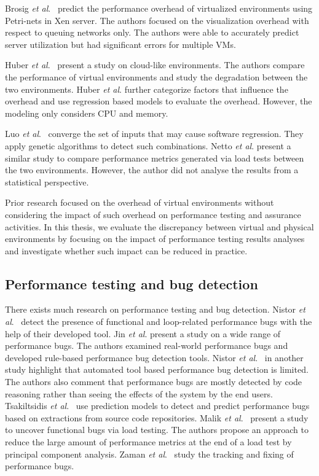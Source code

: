Brosig \textit{et al$.$}~\cite{brosig2013evaluating} predict the performance overhead of virtualized environments using Petri-nets in Xen server. The authors focused on the visualization overhead with respect to queuing networks only. The authors were able to accurately predict server utilization but had significant errors for multiple VMs.


Huber \textit{et al$.$}~\cite{huber2011evaluating} present a study on cloud-like environments. The authors compare the performance of virtual environments and study the degradation between the two environments. Huber \textit{et al$.$} further categorize factors that influence the overhead and use regression based models to evaluate the overhead. However, the modeling only considers CPU and memory.


Luo \textit{et al$.$}~\cite{Luo:2016:MPR:2901739.2901765} converge the set of inputs that may cause software regression. They apply genetic algorithms to detect such combinations. Netto \textit{et al$.$} \cite{netto2011evaluating} present a similar study to compare performance metrics generated via load tests between the two environments. However, the author did not analyse the results from a statistical perspective.

Prior research focused on the overhead of virtual environments without considering the impact of such overhead on performance testing and assurance activities. In this thesis, we evaluate the discrepancy between virtual and physical environments by focusing on the impact of performance testing results analyses and investigate whether such impact can be reduced in practice.


\subsection{Performance testing and bug detection}

There exists much research on performance testing and bug detection. Nistor \textit{et al$.$}~\cite{Nistor} detect the presence of functional and loop-related performance bugs with the help of their developed tool. Jin \textit{et al$.$} \cite{Jin} present a study on a wide range of performance bugs. The authors examined real-world performance bugs and developed rule-based performance bug detection tools. Nistor \textit{et al$.$}~\cite{nistor_2} in another study highlight that automated tool based performance bug detection is limited. The authors also comment that performance bugs are mostly detected by code reasoning rather than seeing the effects of the system by the end users. Tsakiltsidis \textit{et al$.$}~\cite{Tsakiltsidis} use prediction models to detect and predict performance bugs based on extractions from source code repositories. Malik \textit{et al$.$}~\cite{h_malik_p_bugs} present a study to uncover functional bugs via load testing. The authors propose an approach to reduce the large amount of performance metrics at the end of a load test by principal component analysis. Zaman \textit{et al$.$}~\cite{zaman_p_bugs} study the tracking and fixing of performance bugs.

